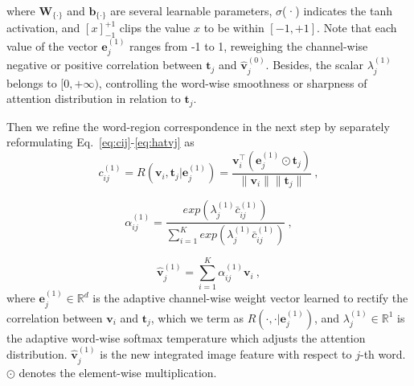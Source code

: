 \documentclass[journal]{IEEEtran}\newcommand{\ignore}[1]{}
\begin{document}
where $\boldsymbol{W}_{\{\cdot\}}$ and $\boldsymbol{b}_{\{\cdot\}}$ are several learnable parameters, $\sigma$(·) indicates the tanh activation, and $[x]_{-1}^{+1}$ clips the value $x$ to be within $[-1, +1]$. Note that each value of the vector $\boldsymbol{e}_{j}^{(1)}$ ranges from -1 to 1, reweighing the channel-wise negative or positive correlation between $\boldsymbol{t}_{j}$ and $\hat{\boldsymbol{v}}_{j}^{(0)}$. Besides, the scalar $\lambda_{j}^{(1)}$ belongs to $[0, +\infty)$, controlling the word-wise smoothness or sharpness of attention distribution in relation to $\boldsymbol{t}_{j}$.


Then we refine the word-region correspondence in the next step by separately reformulating Eq.~\eqref{eq:cij}-\eqref{eq:hatvj} as
\begin{equation}
\label{eq:updatecij}
    c_{ij}^{(1)} = R(\boldsymbol{v}_{i}, \boldsymbol{t}_{j}|\boldsymbol{e}_{j}^{(1)}) = \frac{\boldsymbol{v}_{i}^{\top} (\boldsymbol{e}_{j}^{(1)} \odot \boldsymbol{t}_{j})}{\|\boldsymbol{v}_{i}\|\|\boldsymbol{t}_{j}\|} \ ,
\end{equation}


\begin{equation}
\label{eq:updatealphaij}
    \alpha_{ij}^{(1)} = \frac{exp({\lambda_{j}^{(1)}}\bar{c}_{ij}^{(1)})}{{\sum}_{i=1}^{K}exp({\lambda_{j}^{(1)}}\bar{c}_{ij}^{(1)})} \ ,
\end{equation}


\begin{equation}
\label{eq:updateahatvj}
    \hat{\boldsymbol{v}}_{j}^{(1)} = \sum \limits_{i=1}^{K}{\alpha}_{ij}^{(1)}\boldsymbol{v}_{i} \ ,
\end{equation}
where $\boldsymbol{e}_{j}^{(1)} \in \mathbb{R}^{d}$ is the adaptive channel-wise weight vector learned to rectify the correlation between $\boldsymbol{v}_{i}$ and $\boldsymbol{t}_{j}$, which we term as $R(\cdot, \cdot|\boldsymbol{e}_{j}^{(1)})$, and $\lambda_{j}^{(1)} \in \mathbb{R}^{1}$ is the adaptive word-wise softmax temperature which adjusts the attention distribution. $\hat{\boldsymbol{v}}_{j}^{(1)}$ is the new integrated image feature with respect to $j$-th word. $\odot$ denotes the element-wise multiplication. 
\end{document}
